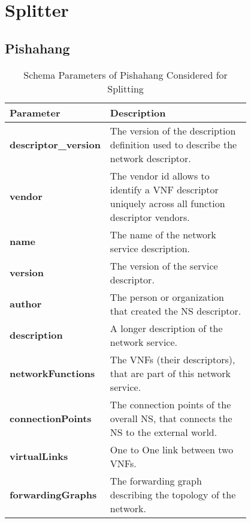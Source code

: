 \newpage
\section{Splitter}
\label{psplitter}
\subsection{Pishahang}
\begin{table}[htbp] \cite{SONATASchemaDocumentation}
	\begin{center}
		\caption{Schema Parameters of Pishahang Considered for Splitting}
		\label{tab:table1}
		\begin{tabular}{|l|p{0.8\linewidth}|}
			\textbf{Parameter} & \textbf{Description}\\
			
			\hline
			\textbf{descriptor\_version} & The version of the description definition used to describe the network descriptor. \\ 
			\textbf{vendor } & The vendor id allows to identify a VNF descriptor uniquely across all function descriptor vendors.  \\
			\textbf{name} & The name of the network service description. \\
			\textbf{version} & The version of the service descriptor. \\
			\textbf{author} & The person or organization that created the NS descriptor. \\
			\textbf{description} & A longer description of the network service. \\
			\textbf{networkFunctions} & The VNFs (their descriptors), that are part of this network service. \\
			\textbf{connectionPoints} & The connection points of the overall NS, that connects the NS to the external world. \\
			\textbf{virtualLinks} & One to One link between two VNFs. \\
			\textbf{forwardingGraphs} & The forwarding graph describing the topology of the network. \\
		\end{tabular}
	\end{center}
\end{table}
\pagebreak
